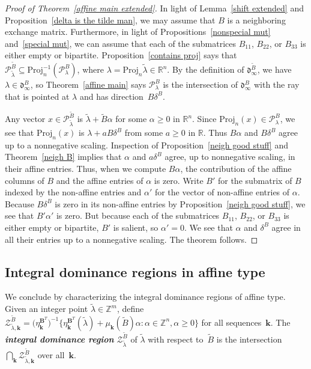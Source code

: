 \documentclass{amsart}
\theoremstyle{definition}
\theoremstyle{remark}
\numberwithin{equation}{section}
\newcommand{\newword}[1]{\textbf{\emph{#1}}}
\newcommand{\integers}{\mathbb Z}
\newcommand{\reals}{\mathbb R}
\newcommand{\sett}[1]{{\bigl\lbrace #1 \bigr\rbrace}}
\newcommand{\0}{{\mathbf{0}}}
\newcommand{\Proj}{\mathrm{Proj}}
\newcommand{\kk}{{\boldsymbol{k}}}
\newcommand{\tB}{{\widetilde{B}}}
\newcommand{\BB}{\mathbf{B}}
\renewcommand{\P}{\mathcal{P}}
\newcommand{\IP}{\mathcal{Z}}
\renewcommand{\d}{{\mathfrak d}}
\begin{document}
\begin{proof}[Proof of Theorem~\ref{affine main extended}]
In light of Lemma~\ref{shift extended} and Proposition~\ref{delta is the tilde man}, we may assume that $B$ is a neighboring exchange matrix.
Furthermore, in light of Propositions~\ref{nonspecial mut} and~\ref{special mut}, we can assume that each of the submatrices $B_{11}$, $B_{22}$, or $B_{33}$ is either empty or bipartite.
  Proposition~\ref{contains proj} says that $\P_{\tilde\lambda}^\tB\subseteq\Proj_n^{-1}(\P_{\lambda}^B)$, where $\lambda=\Proj_n\tilde\lambda\in\reals^n$.
By the definition of $\d_\infty^\tB$, we have $\lambda\in\d_\infty^B$, so Theorem~\ref{affine main} says $\P_{\lambda}^B$ is the intersection of $\d_\infty^B$ with the ray that is pointed at $\lambda$ and has direction~$B\delta^B$.  

  Any vector $x\in\P_{\tilde\lambda}^\tB$ is $\tilde\lambda+\tB\alpha$ for some $\alpha\ge0$ in $\reals^n$.
Since $\Proj_n(x)\in\P_{\lambda}^B$, we see that $\Proj_n(x)$ is $\lambda+aB\delta^B$ from some $a\ge0$ in $\reals$.
Thus $B\alpha$ and $B\delta^B$ agree up to a nonnegative scaling.
Inspection of Proposition~\ref{neigh good stuff} and Theorem~\ref{neigh B} implies that $\alpha$ and $a\delta^B$ agree, up to nonnegative scaling, in their affine entries.
Thus, when we compute $B\alpha$, the contribution of the affine columns of $B$ and the affine entries of $\alpha$ is zero.  
Write $B'$ for the submatrix of $B$ indexed by the non-affine entries and $\alpha'$ for the vector of non-affine entries of $\alpha$.
Because $B\delta^B$ is zero in its non-affine entries by Proposition~\ref{neigh good stuff}, we see that $B'\alpha'$ is zero.
But because each of the submatrices $B_{11}$, $B_{22}$, or $B_{33}$ is either empty or bipartite, $B'$ is salient, so $\alpha'=0$.
We see that $\alpha$ and $\delta^B$ agree in all their entries up to a nonnegative scaling.
The theorem follows.
\end{proof}

\subsection{Integral dominance regions in affine type}
\label{sec:integral}
We conclude by characterizing the integral dominance regions of affine type. 
Given an integer point $\tilde\lambda\in\integers^m$, define $\IP^\tB_{\tilde\lambda,\kk}=\bigl(\eta_{\kk}^{\BB^T}\bigr)^{-1}\sett{\eta_\kk^{\BB^T}(\tilde\lambda)+\mu_\kk(\tB)\alpha:\alpha\in\integers^n,\alpha\ge0}$ for all sequences~$\kk$.
The \newword{integral dominance region} $\IP^\tB_{\tilde\lambda}$ of $\tilde\lambda$ with respect to~$\tB$ is the intersection $\bigcap_\kk\IP^\tB_{\tilde\lambda,\kk}$ over all~$\kk$.
\end{document}
